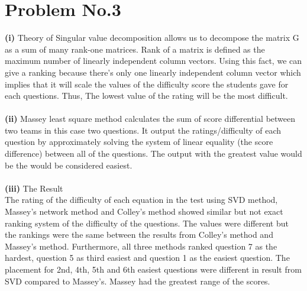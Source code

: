 \section*{Problem No.3} \label{sec:prob3}

\textbf{(i)} Theory of Singular value decomposition allows us to decompose the matrix G as a sum of many rank-one matrices. Rank of a matrix is defined as the maximum number of linearly independent column vectors. Using this fact, we can give a ranking because there's only one linearly independent column vector which implies that it will scale the values of the difficulty score the students gave for each questions. Thus, The lowest value of the rating will be the most difficult.
\\
\\
\textbf{(ii)} 
Massey least square method calculates the sum of score differential between two teams in this case two questions. It output the ratings/difficulty of each question by approximately solving the system of linear equality (the score difference) between all of the questions. The output with the greatest value would be the would be considered easiest. 
\\
\\
\textbf{(iii)} The Result
\\
The rating of the difficulty of each equation in the test using SVD method, Massey's network method and Colley's method showed similar but not exact ranking system of the difficulty of the questions. The values were different but the rankings were the same between the results from Colley's method and Massey's method. Furthermore, all three methods ranked question 7 as the hardest, question 5 as third easiest and question 1 as the easiest question. The placement for 2nd, 4th, 5th and 6th easiest questions were different in result from SVD compared to Massey's. Massey had the greatest range of the scores.
